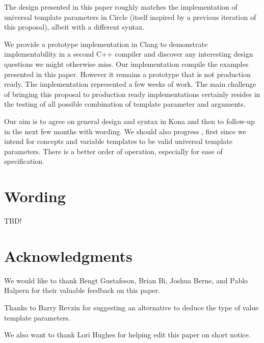 \documentclass{wg21}
\begin{document}
The design presented in this paper roughly matches the implementation of universal template parameters in Circle (itself inspired by a previous iteration of this proposal),
albeit with a different syntax.

We provide a prototype implementation in Clang to demonstrate implementability in a second C++ compiler and discover any interesting design questions we might otherwise
miss. Our implementation compile the examples presented in this paper. However it remains a prototype that is not production ready.
The implementation represented a few weeks of work. The main challenge of bringing this proposal to production ready implementations certainly resides in the
testing of all possible combination of template parameter and arguments.


Our aim is to agree on general design and syntax in Kona and then to follow-up in the next few months with wording.
We should also progress , first since we intend for concepts and variable templates to be valid universal template parameters.
There is a better order of operation, especially for ease of specification.

\section{Wording}

TBD!

\section{Acknowledgments}

We would like to thank Bengt Gustafsson, Brian Bi, Joshua Berne, and Pablo Halpern for their
valuable feedback on this paper.

Thanks to Barry Revzin for suggesting an alternative to deduce the type of value template parameters.

We also want to thank Lori Hughes for helping edit this paper on short notice.





\renewcommand{\section}[2]{}%

\begin{thebibliography}{9}


\end{thebibliography}
\end{document}
